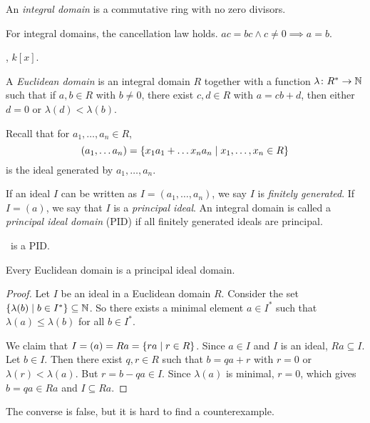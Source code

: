 \begin{definition} \label{def:ring:integral_domain}
    An \emph{integral domain} is a commutative ring with no zero divisors.
\end{definition}
For integral domains, the cancellation law holds.
$ac = bc \land c \ne 0 \implies a = b$.
\begin{example}
    \Z, $k[x]$.
\end{example}

\begin{definition} \label{def:ring:euclidean_domain}
    A \emph{Euclidean domain} is an integral domain $R$ together with
    a function $\lambda\colon R^* \to \mathbb{N}$ such that if
    $a, b \in R$ with $b \ne 0$, there exist $c, d \in R$ with
    $a = cb + d$, then either $d = 0$ or $\lambda(d) < \lambda(b)$.
\end{definition}

Recall that for $a_1, \dots, a_n \in R$, \[
    (a_1, \dots a_n)
        = \set{x_1 a_1 + \dots x_n a_n \mid x_1, \dots, x_n \in R}
\] is the ideal generated by $a_1, \dots, a_n$.
\begin{definition*} \label{def:principal_ideals}
    If an ideal $I$ can be written as $I = (a_1, \dots, a_n)$, we say $I$ is
    \emph{finitely generated}.
    If $I = (a)$, we say that $I$ is a \emph{principal ideal}.
    An integral domain is called a \emph{principal ideal domain} (PID)
    if all finitely generated ideals are principal.
\end{definition*}
\begin{example}
    \Z\ is a PID.
\end{example}

\begin{proposition}
    Every Euclidean domain is a principal ideal domain.
\end{proposition}
\begin{proof}
    Let $I$ be an ideal in a Euclidean domain $R$.
    Consider the set $\set{\lambda(b) \mid b \in I^*} \subseteq \N$.
    So there exists a minimal element $a \in I^*$ such that
    $\lambda(a) \le \lambda(b)$ for all $b \in I^*$.

    We claim that $I = (a) = Ra = \set{ra \mid r \in R}$.
    Since $a \in I$ and $I$ is an ideal, $Ra \subseteq I$.
    Let $b \in I$.
    Then there exist $q, r \in R$ such that $b = qa + r$ with $r = 0$ or
    $\lambda(r) < \lambda(a)$.
    But $r = b - qa \in I$.
    Since $\lambda(a)$ is minimal, $r = 0$, which gives $b = qa \in Ra$
    and $I \subseteq Ra$.
\end{proof}
The converse is false, but it is hard to find a counterexample.

